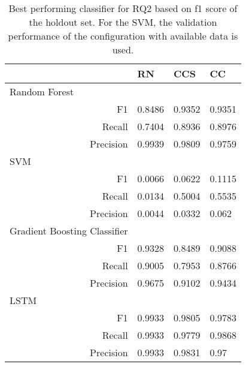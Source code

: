 \begin{table}[]
    \begin{tabularx}{\textwidth}{rXXX}
    \toprule
    \multicolumn{1}{l}{}                             & RN         & CCS & CC \\ \midrule
    \multicolumn{1}{l}{Random Forest}                & \multicolumn{1}{r}{} &            &              \\
    F1                                               & 0.8486               & 0.9352     & 0.9351       \\
    Recall                                           & 0.7404               & 0.8936     & 0.8976       \\
    Precision                                        & 0.9939               & 0.9809     & 0.9759       \\ \midrule
    \multicolumn{1}{l}{SVM}                          &                      &            &              \\
    F1                                               &   0.0066             &  0.0622    &   0.1115     \\
    Recall                                           &   0.0134             &  0.5004    &   0.5535     \\
    Precision                                        &   0.0044             &  0.0332    &   0.062      \\ \midrule
    \multicolumn{1}{l}{Gradient Boosting Classifier} &                      &            &              \\
    F1                                               & 0.9328               & 0.8489     & 0.9088       \\
    Recall                                           & 0.9005               & 0.7953     & 0.8766       \\
    Precision                                        & 0.9675               & 0.9102     & 0.9434       \\ \midrule
    \multicolumn{1}{l}{LSTM}                         &                      &            &              \\
    F1                                               & 0.9933               & 0.9805     & 0.9783       \\
    Recall                                           & 0.9933               & 0.9779     & 0.9868       \\
    Precision                                        & 0.9933               & 0.9831     & 0.97       \\ \bottomrule
    \end{tabularx}
    \caption{Best performing classifier for RQ2 based on f1 score of the holdout set. For the SVM, the validation performance of the configuration with available data is used.}
    \label{tab:rq2_best_classifier}
    \end{table}